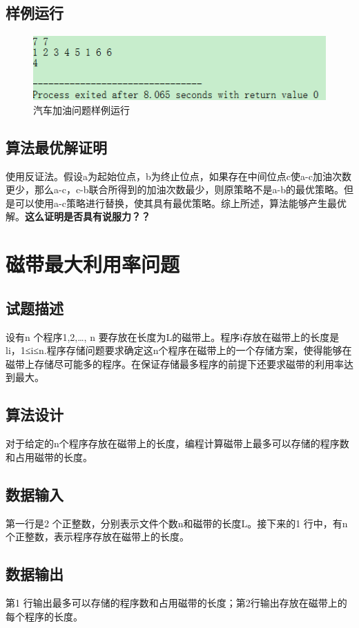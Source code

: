 \documentclass[UTF8]{ctexart}
\begin{document}
    \subsection{样例运行}
    \begin{figure}[!htb]
      \centering
      \includegraphics[width=1.0\textwidth]{../img/4.9.PNG}
      \caption{汽车加油问题样例运行}\label{汽车加油问题样例运行}
    \end{figure}
    \subsection{算法最优解证明}
    使用反证法。假设a为起始位点，b为终止位点，如果存在中间位点c使a-c加油次数更少，那么a-c，c-b联合所得到的加油次数最少，则原策略不是a-b的最优策略。但是可以使用a-c策略进行替换，使其具有最优策略。综上所述，算法能够产生最优解。\textbf{这么证明是否具有说服力？？}

    \section{磁带最大利用率问题}
    \subsection{试题描述}
    设有n 个程序{1,2,…, n }要存放在长度为L的磁带上。程序i存放在磁带上的长度是li，1≤i≤n.程序存储问题要求确定这n个程序在磁带上的一个存储方案，使得能够在磁带上存储尽可能多的程序。在保证存储最多程序的前提下还要求磁带的利用率达到最大。
    \subsection{算法设计}
    对于给定的n个程序存放在磁带上的长度，编程计算磁带上最多可以存储的程序数和占用磁带的长度。
    \subsection{数据输入}
    第一行是2 个正整数，分别表示文件个数n和磁带的长度L。接下来的1 行中，有n个正整数，表示程序存放在磁带上的长度。
    \subsection{数据输出}
    第1 行输出最多可以存储的程序数和占用磁带的长度；第2行输出存放在磁带上的每个程序的长度。
\end{document}
